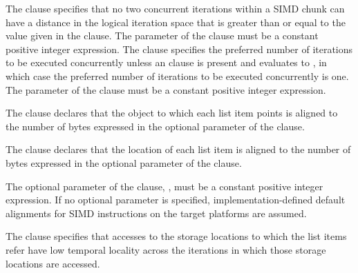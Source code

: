 The  clause specifies that no two concurrent iterations within a SIMD chunk can have a distance in the logical iteration space that is greater than or equal to the value given in the clause.
The parameter of the  clause must be a constant positive integer expression.
The  clause specifies the preferred number of iterations to be executed concurrently unless an  clause is present and evaluates to , in which case the preferred number of iterations to be executed concurrently is one.
The parameter of the  clause must be a constant positive integer expression.


\begin{ccppspecific}
The  clause declares that the object to which each list item points is aligned to
the number of bytes expressed in the optional parameter of the  clause.
\end{ccppspecific}

\begin{fortranspecific}

The  clause declares that the location of each list item
is aligned to the number of bytes expressed in the optional parameter
of the  clause.

\end{fortranspecific}

The optional parameter of the  clause, , must be a constant positive
integer expression. If no optional parameter is specified, implementation-defined default
alignments for SIMD instructions on the target platforms are assumed.

The  clause specifies that accesses to the storage locations to which the list items refer have low temporal locality across the iterations in which those storage locations are accessed.

